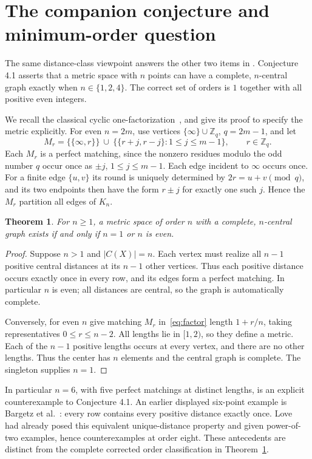 \documentclass[11pt]{article}
\newtheorem{theorem}{Theorem}
\begin{document}
\section{The companion conjecture and minimum-order question}
The same distance-class viewpoint answers the other two items in
\cite[Section 4, p.~13]{DR}. Conjecture 4.1 asserts that a metric
space with $n$ points can have a complete, $n$-central graph exactly
when $n\in\{1,2,4\}$. The correct set of orders is $1$ together
with all positive even integers.

We recall the classical cyclic one-factorization~\cite[Theorem 9.1, p.~85]{H},
and give its proof to specify the metric explicitly. For even $n=2m$, use
vertices $\{\infty\}\cup\mathbb Z_q$, $q=2m-1$, and let
\begin{equation}\label{eq:factor}
 M_r=\{\{\infty,r\}\}\ \cup\
 \bigl\{\{r+j,r-j\}:1\le j\le m-1\bigr\},\qquad r\in\mathbb Z_q.
\end{equation}
Each $M_r$ is a perfect matching, since the nonzero residues modulo
the odd number $q$ occur once as $\pm j$, $1\le j\le m-1$.
Each edge incident to $\infty$ occurs once. For a finite edge
$\{u,v\}$ its round is uniquely determined by $2r=u+v\pmod q$,
and its two endpoints then have the form $r\pm j$ for exactly one
such $j$. Hence the $M_r$ partition all edges of $K_n$.

\begin{theorem}\label{thm:companion}
For $n\ge1$, a metric space of order $n$ with a complete,
$n$-central graph exists if and only if $n=1$ or $n$ is even.
\end{theorem}
\begin{proof}
Suppose $n>1$ and $|C(X)|=n$. Each vertex must realize all
$n-1$ positive central distances at its $n-1$ other vertices.
Thus each positive distance occurs exactly once in every row, and
its edges form a perfect matching. In particular $n$ is even;
all distances are central, so the graph is automatically complete.

Conversely, for even $n$ give matching $M_r$ in~\eqref{eq:factor}
length $1+r/n$, taking representatives $0\le r\le n-2$.
All lengths lie in $[1,2)$, so they define a metric. Each of the
$n-1$ positive lengths occurs at every vertex, and there are no
other lengths. Thus the center has $n$ elements and the central
graph is complete. The singleton supplies $n=1$.
\end{proof}

In particular $n=6$, with five perfect matchings at distinct lengths,
is an explicit counterexample to Conjecture 4.1.
An earlier displayed six-point example is Bargetz et al.~\cite[Example 3.11
and Figure 3]{BBKL}: every row contains every positive distance exactly once.
Love~\cite{L} had already posed this equivalent unique-distance property
and given power-of-two examples, hence counterexamples at order eight.
These antecedents are distinct from the complete corrected order
classification in Theorem~\ref{thm:companion}.
\end{document}
